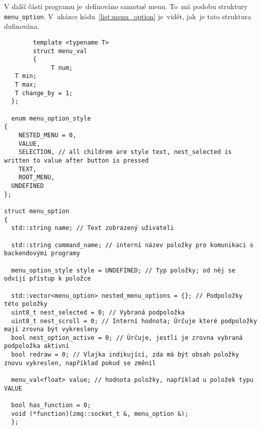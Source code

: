 V další části programu je~definováno samotné menu. To~má podobu struktury \texttt{menu_option}. V~ukázce kódu~\ref{list:menu_option} je~vidět, jak~je tato struktura dufinována.
\begin{code}
    \begin{verbatim}
        template <typename T>
        struct menu_val
        {
             T num;
   T min;
   T max;
   T change_by = 1;
  };
  
  enum menu_option_style
{
    NESTED_MENU = 0,
    VALUE,
    SELECTION, // all childrem are style text, nest_selected is written to value after button is pressed
    TEXT,
    ROOT_MENU,
  UNDEFINED
};

struct menu_option
{
  std::string name; // Text zobrazený uživateli

  std::string command_name; // interní název položky pro komunikaci s backendovými programy

  menu_option_style style = UNDEFINED; // Typ položky; od něj se odvíjí přístup k položce

  std::vector<menu_option> nested_menu_options = {}; // Podpoložky této položky
  uint8_t nest_selected = 0; // Vybraná podpoložka
  uint8_t nest_scroll = 0; // Interní hodnota; Úrčuje které podpoložky mají zrovna být vykresleny
  bool nest_option_active = 0; // Úrčuje, jestli je zrovna vybraná podpoložka aktivní
  bool redraw = 0; // Vlajka indikující, zda má být obsah položky znovu vykreslen, například pokud se změnil

  menu_val<float> value; // hodnota položky, například u položek typu VALUE

  bool has_function = 0;
  void (*function)(zmq::socket_t &, menu_option &);
  };
\end{verbatim}
\end{code}

